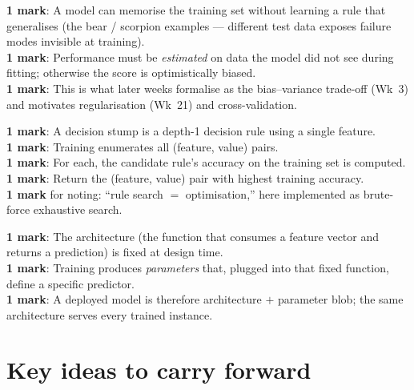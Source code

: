 \documentclass[11pt, a4paper]{article}
\begin{document}
\begin{exambox}
\textbf{1 mark}: A model can memorise the training set without learning a rule that generalises (the bear / scorpion examples — different test data exposes failure modes invisible at training). \\
\textbf{1 mark}: Performance must be \emph{estimated} on data the model did not see during fitting; otherwise the score is optimistically biased. \\
\textbf{1 mark}: This is what later weeks formalise as the bias--variance trade-off (Wk~3) and motivates regularisation (Wk~21) and cross-validation.
\end{exambox}

\begin{exambox}
\textbf{1 mark}: A decision stump is a depth-1 decision rule using a single feature. \\
\textbf{1 mark}: Training enumerates all (feature, value) pairs. \\
\textbf{1 mark}: For each, the candidate rule's accuracy on the training set is computed. \\
\textbf{1 mark}: Return the (feature, value) pair with highest training accuracy. \\
\textbf{1 mark} for noting: ``rule search $=$ optimisation,'' here implemented as brute-force exhaustive search.
\end{exambox}

\begin{exambox}
\textbf{1 mark}: The architecture (the function that consumes a feature vector and returns a prediction) is fixed at design time. \\
\textbf{1 mark}: Training produces \emph{parameters} that, plugged into that fixed function, define a specific predictor. \\
\textbf{1 mark}: A deployed model is therefore architecture $+$ parameter blob; the same architecture serves every trained instance.
\end{exambox}

\section*{Key ideas to carry forward}
\end{document}
